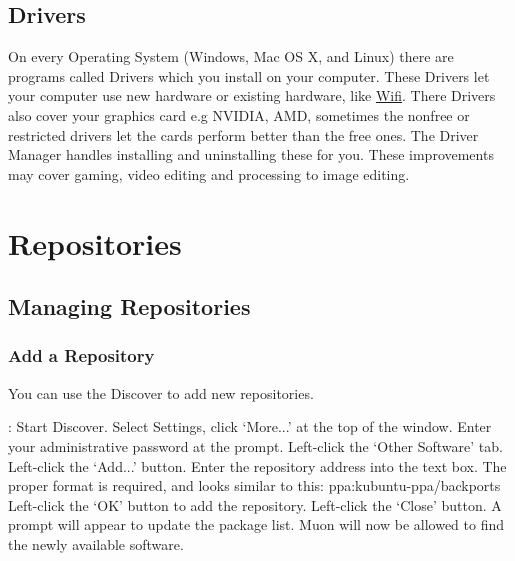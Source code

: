 \documentclass[letterpaper,10pt,english]{sphinxmanual}
\begin{document}
\section{Drivers}
\label{\detokenize{docs/advanced:drivers}}
On every Operating System (Windows, Mac OS X, and Linux) there are programs called Drivers which you install on your computer. These Drivers let your computer use new hardware or existing hardware, like \href{https://userbase.kde.org/Kubuntu/Basic\#Wireless}{Wifi}. There Drivers also cover your graphics card e.g NVIDIA, AMD, sometimes the nonfree or restricted drivers let the cards perform better than the free ones. The Driver Manager handles installing and uninstalling these for you. These improvements may cover gaming, video editing and processing to image editing.


\chapter{Repositories}
\label{\detokenize{docs/repositories:repositories}}\label{\detokenize{docs/repositories::doc}}\label{\detokenize{docs/repositories:repositories-link}}

\section{Managing Repositories}
\label{\detokenize{docs/repositories:managing-repositories}}

\subsection{Add a Repository}
\label{\detokenize{docs/repositories:add-a-repository}}
You can use the Discover to add new repositories.

: Start Discover. Select Settings, click `More...' at the top of the window. Enter your administrative password at the prompt. Left-click the `Other Software' tab. Left-click the `Add...' button. Enter the repository address into the text box. The proper format is required, and looks similar to this: ppa:kubuntu-ppa/backports Left-click the `OK' button to add the repository. Left-click the `Close' button. A prompt will appear to update the package list. Muon will now be allowed to find the newly available software.

\end{document}
